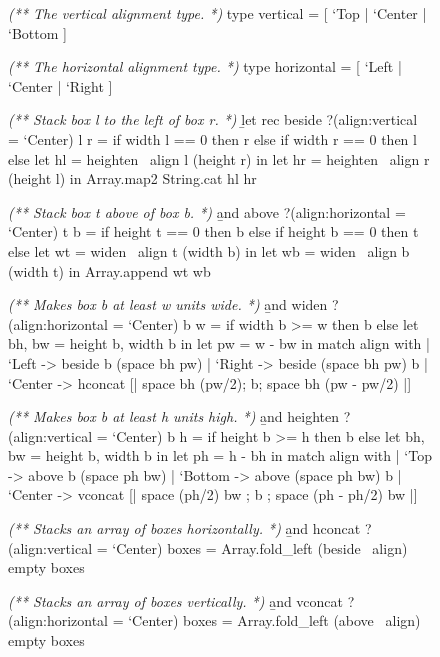 \documentclass{article}
\begin{document}
\begin{figure}
\begin{code}[ocaml]
\emph{(** The vertical alignment type. *)}
type vertical   = [ `Top  | `Center | `Bottom ]

\emph{(** The horizontal alignment type. *)}
type horizontal = [ `Left | `Center | `Right  ]

\emph{(** Stack box l to the left of box r. *)}
\b{let rec} beside ?(align:vertical = `Center) l r =\label{ref-beside}
    if width l == 0 then r else if width r == 0 then l
    else let hl = heighten ~align l (height r) in
         let hr = heighten ~align r (height l) in
         Array.map2 String.cat hl hr

\emph{(** Stack box t above of box b. *)}
\b{and} above ?(align:horizontal = `Center) t b =\label{ref-above}
    if height t == 0 then b else if height b == 0 then t
    else let wt = widen ~align t (width b) in
         let wb = widen ~align b (width t) in
         Array.append wt wb

\emph{(** Makes box b at least w units wide. *)}
\b{and} widen ?(align:horizontal = `Center) b w =\label{ref-widen}
    if width b >= w then b
    else let bh, bw = height b, width b in
         let pw = w - bw in
         match align with
         | `Left   -> beside b (space bh pw)
         | `Right  -> beside (space bh pw) b
         | `Center -> hconcat
                      [| space bh (pw/2); b; space bh (pw - pw/2) |]

\emph{(** Makes box b at least h units high. *)}
\b{and} heighten ?(align:vertical = `Center) b h =\label{ref-heighten}
    if height b >= h then b
    else let bh, bw = height b, width b in
         let ph = h - bh in
         match align with
         | `Top    -> above b (space ph bw)
         | `Bottom -> above (space ph bw) b
         | `Center -> vconcat [| space (ph/2) bw
                               ; b
                               ; space (ph - ph/2) bw |]

\emph{(** Stacks an array of boxes horizontally. *)}
\b{and} hconcat ?(align:vertical = `Center) boxes =\label{ref-hconcat}
    Array.fold_left (beside ~align) empty boxes

\emph{(** Stacks an array of boxes vertically. *)}
\b{and} vconcat ?(align:horizontal = `Center) boxes =\label{ref-vconcat}
    Array.fold_left (above ~align) empty boxes
\end{code}
\end{figure}
\end{document}
